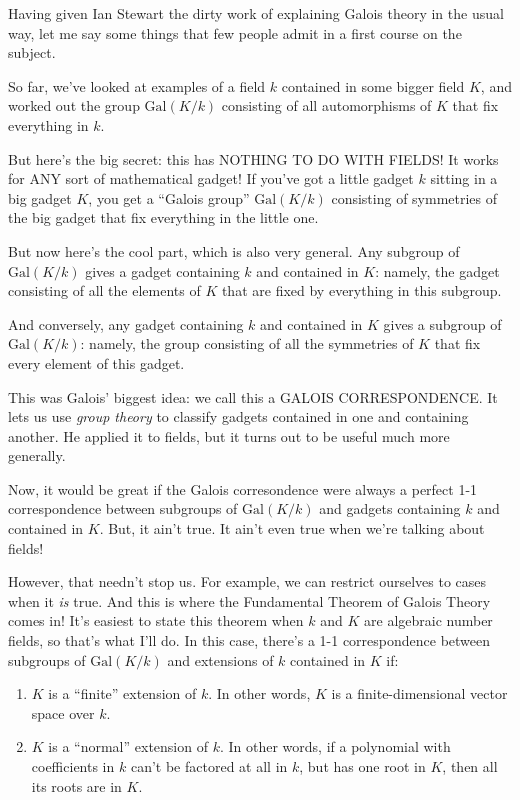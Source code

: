 \documentclass{article}
\begin{document}
Having given Ian Stewart the dirty work of explaining Galois theory in
the usual way, let me say some things that few people admit in a first
course on the subject.

So far, we've looked at examples of a field \(k\) contained in some
bigger field \(K\), and worked out the group \(\mathrm{Gal}(K/k)\)
consisting of all automorphisms of \(K\) that fix everything in \(k\).

But here's the big secret: this has NOTHING TO DO WITH FIELDS! It works
for ANY sort of mathematical gadget! If you've got a little gadget \(k\)
sitting in a big gadget \(K\), you get a ``Galois group''
\(\mathrm{Gal}(K/k)\) consisting of symmetries of the big gadget that
fix everything in the little one.

But now here's the cool part, which is also very general. Any subgroup
of \(\mathrm{Gal}(K/k)\) gives a gadget containing \(k\) and contained
in \(K\): namely, the gadget consisting of all the elements of \(K\)
that are fixed by everything in this subgroup.

And conversely, any gadget containing \(k\) and contained in \(K\) gives
a subgroup of \(\mathrm{Gal}(K/k)\): namely, the group consisting of all
the symmetries of \(K\) that fix every element of this gadget.

This was Galois' biggest idea: we call this a GALOIS CORRESPONDENCE. It
lets us use \emph{group theory} to classify gadgets contained in one and
containing another. He applied it to fields, but it turns out to be
useful much more generally.

Now, it would be great if the Galois corresondence were always a perfect
1-1 correspondence between subgroups of \(\mathrm{Gal}(K/k)\) and
gadgets containing \(k\) and contained in \(K\). But, it ain't true. It
ain't even true when we're talking about fields!

However, that needn't stop us. For example, we can restrict ourselves to
cases when it \emph{is} true. And this is where the Fundamental Theorem
of Galois Theory comes in! It's easiest to state this theorem when \(k\)
and \(K\) are algebraic number fields, so that's what I'll do. In this
case, there's a 1-1 correspondence between subgroups of
\(\mathrm{Gal}(K/k)\) and extensions of \(k\) contained in \(K\) if:

\begin{enumerate}
\def\labelenumi{\roman{enumi})}
\item
  \(K\) is a ``finite'' extension of \(k\). In other words, \(K\) is a
  finite-dimensional vector space over \(k\).
\item
  \(K\) is a ``normal'' extension of \(k\). In other words, if a
  polynomial with coefficients in \(k\) can't be factored at all in
  \(k\), but has one root in \(K\), then all its roots are in \(K\).
\end{enumerate}
\end{document}
